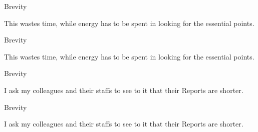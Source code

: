 \documentclass[
  ignorenonframetext,
  aspectratio=169]{beamer}
\begin{document}
\begin{frame}{Brevity}
\protect\hypertarget{brevity-3}{}
\Large

This wastes time, while energy has to be spent in looking for the
essential points.

\par

\vfill\Huge


\vfill

\mbox{}
\end{frame}

\begin{frame}{Brevity}
\protect\hypertarget{brevity-4}{}
\Large

This \textcolor{softblue}{wastes time}, while energy has to be spent in
looking for \textcolor{softblue}{the essential points}.

\par

\vfill\Huge


\vfill
\end{frame}

\begin{frame}{Brevity}
\protect\hypertarget{brevity-5}{}
\Large

I ask my colleagues and their staffs to see to it that their Reports are
shorter.

\vfill\Huge


\vfill
\end{frame}

\begin{frame}{Brevity}
\protect\hypertarget{brevity-6}{}
\Large

I ask my colleagues and their staffs to see to it that
\textcolor{softblue}{their Reports are shorter}.

\vfill\Huge


\vfill
\end{frame}
\end{document}
